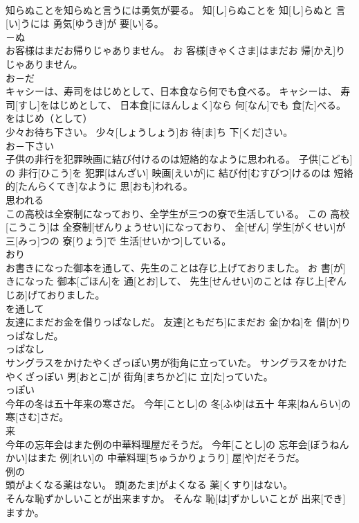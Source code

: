 \documentclass[8pt]{extreport}
\begin{document}
\begin{CJK}{UTF8}{min}
\\	知らぬことを知らぬと言うには勇気が要る。	知[し]らぬことを 知[し]らぬと 言[い]うには 勇気[ゆうき]が 要[い]る。	
\\	－ぬ	
\\	お客様はまだお帰りじゃありません。	お 客様[きゃくさま]はまだお 帰[かえ]りじゃありません。	
\\	お－だ	
\\	キャシーは、寿司をはじめとして、日本食なら何でも食べる。	キャシーは、 寿司[すし]をはじめとして、 日本食[にほんしょく]なら 何[なん]でも 食[た]べる。	
\\	をはじめ（として）	
\\	少々お待ち下さい。	少々[しょうしょう]お 待[ま]ち 下[くだ]さい。	
\\	お－下さい	
\\	子供の非行を犯罪映画に結び付けるのは短絡的なように思われる。	子供[こども]の 非行[ひこう]を 犯罪[はんざい] 映画[えいが]に 結び付[むすびつ]けるのは 短絡的[たんらくてき]なように 思[おも]われる。	
\\	思われる	
\\	この高校は全寮制になっており、全学生が三つの寮で生活している。	この 高校[こうこう]は 全寮制[ぜんりょうせい]になっており、 全[ぜん] 学生[がくせい]が 三[みっ]つの 寮[りょう]で 生活[せいかつ]している。	
\\	おり	
\\	お書きになった御本を通して、先生のことは存じ上げておりました。	お 書[が]きになった 御本[ごほん]を 通[とお]して、 先生[せんせい]のことは 存じ上[ぞんじあ]げておりました。	
\\	を通して	
\\	友達にまだお金を借りっぱなしだ。	友達[ともだち]にまだお 金[かね]を 借[か]りっぱなしだ。	
\\	っぱなし	
\\	サングラスをかけたやくざっぽい男が街角に立っていた。	サングラスをかけたやくざっぽい 男[おとこ]が 街角[まちかど]に 立[た]っていた。	
\\	っぽい	
\\	今年の冬は五十年来の寒さだ。	今年[ことし]の 冬[ふゆ]は五十 年来[ねんらい]の 寒[さむ]さだ。	
\\	来	
\\	今年の忘年会はまた例の中華料理屋だそうだ。	今年[ことし]の 忘年会[ぼうねんかい]はまた 例[れい]の 中華料理[ちゅうかりょうり] 屋[や]だそうだ。	
\\	例の	
\\	頭がよくなる薬はない。	頭[あたま]がよくなる 薬[くすり]はない。	
\\	そんな恥ずかしいことが出来ますか。	そんな 恥[は]ずかしいことが 出来[でき]ますか。	

\end{CJK}
\end{document}
